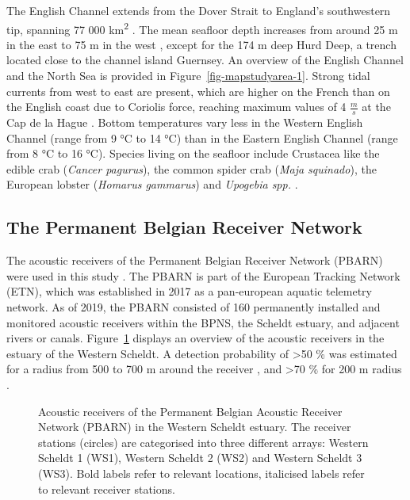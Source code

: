 \documentclass[
  authoryear,
  review,
  3p]{elsarticle}
\begin{document}
The English Channel extends from the Dover Strait to England's
southwestern tip, spanning 77 000 km\textsuperscript{2}
\citep{dauvin_2012}. The mean seafloor depth increases from around 25 m
in the east to 75 m in the west \citep{dauvin_2012}, except for the 174
m deep Hurd Deep, a trench located close to the channel island Guernsey.
An overview of the English Channel and the North Sea is provided in
Figure~\ref{fig-mapstudyarea-1}. Strong tidal currents from west to east
are present, which are higher on the French than on the English coast
due to Coriolis force, reaching maximum values of 4 \(\frac{m}{s}\) at
the Cap de la Hague \citep{salomon_1993}. Bottom temperatures vary less
in the Western English Channel (range from 9 °C to 14 °C) than in the
Eastern English Channel (range from 8 °C to 16 °C). Species living on
the seafloor include Crustacea like the edible crab (\emph{Cancer
pagurus}), the common spider crab (\emph{Maja squinado}), the European
lobster (\emph{Homarus gammarus}) and \emph{Upogebia spp.}
\citep{holme_1966, vaz_2007}.

\hypertarget{the-permanent-belgian-receiver-network}{%
\subsection{The Permanent Belgian Receiver
Network}\label{the-permanent-belgian-receiver-network}}

The acoustic receivers of the Permanent Belgian Receiver Network (PBARN)
were used in this study \citep{reubens_2018}. The PBARN is part of the
European Tracking Network (ETN), which was established in 2017 as a
pan-european aquatic telemetry network. As of 2019, the PBARN consisted
of 160 permanently installed and monitored acoustic receivers within the
BPNS, the Scheldt estuary, and adjacent rivers or canals.
Figure~\ref{fig-mapWS} displays an overview of the acoustic receivers in
the estuary of the Western Scheldt. A detection probability of
\textgreater50 \% was estimated for a radius from 500 to 700 m around
the receiver \citep{goossens_2022}, and \textgreater70 \% for 200 m
radius \citep{reubens_2018}.

\begin{figure}

\begin{minipage}[t]{\linewidth}

{\centering 


\caption{\label{fig-mapWS}Acoustic receivers of the Permanent Belgian
Acoustic Receiver Network (PBARN) in the Western Scheldt estuary. The
receiver stations (circles) are categorised into three different arrays:
Western Scheldt 1 (WS1), Western Scheldt 2 (WS2) and Western Scheldt 3
(WS3). Bold labels refer to relevant locations, italicised labels refer
to relevant receiver stations.}

}

\end{minipage}%

\end{figure}
\end{document}
